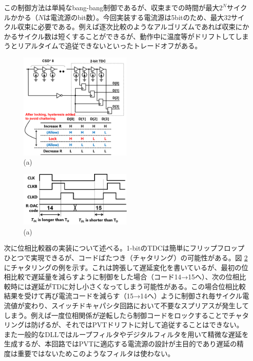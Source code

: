 \documentclass[letterpaper, 10 pt, conference]{ieeeconf}  %
\begin{document}
この制御方法は単純なbang-bang制御であるが、収束までの時間が最大$2^N$サイクルかかる（$N$は電流源のbit数）。今回実装する電流源は5bitのため、最大32サイクル収束に必要である。例えば逐次比較のようなアルゴリズムであれば収束にかかるサイクル数は短くすることができるが、動作中に温度等がドリフトしてしまうとリアルタイムで追従できないといったトレードオフがある。

\begin{figure}[!]
\centering
 \includegraphics[width=0.5\textwidth]{figs/tdc.png}
  \caption{(a) 
}
\label{tdc}
\end{figure}

\begin{figure}[!]
\centering
 \includegraphics[width=0.5\textwidth]{figs/chattering.png}
  \caption{(a) 
}
\label{chattering}
\end{figure}

次に位相比較器の実装について述べる。1-bitのTDCは簡単にフリップフロップひとつで実現できるが、コードばたつき（チャタリング）の可能性がある。図 \ref{chattering}にチャタリングの例を示す。これは誇張して遅延変化を書いているが、最初の位相比較で遅延量を減らすように制御をした場合（コード14→15へ）、次の位相比較時には遅延がTDに対し小さくなってしまう可能性がある。この場合位相比較結果を受けて再び電流コードを減らす（15→14へ）ように制御され毎サイクル電流値が変わり、スイッチドキャパシタ回路において不要なスプリアスが発生してしまう。例えば一度位相関係が逆転したら制御コードをロックすることでチャタリングは防げるが、それではPVTドリフトに対して追従することはできない。また一般的なDLLではループフィルタ\cite{sidiropoulos1997semidigital}やデジタルフィルタ\cite{kim20172}を用いて精微な遅延を生成するが、本回路ではPVTに適応する電流源の設計が主目的であり遅延の精度は重要ではないためこのようなフィルタは使わない。
\end{document}
